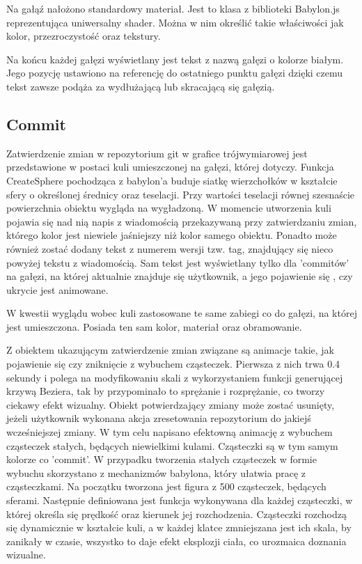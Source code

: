 \documentclass[12pt,a4paper,polish,thesis]{dcsbook}
\begin{document}
{	Na gałąź nałożono standardowy materiał. Jest to klasa z biblioteki Babylon.js reprezentująca uniwersalny shader.  Można w nim określić takie właściwości jak kolor, przezroczystość oraz tekstury.

	Na końcu każdej gałęzi wyświetlany jest tekst z nazwą gałęzi o kolorze białym. Jego pozycję ustawiono na referencję do ostatniego punktu gałęzi dzięki czemu tekst zawsze podąża za wydłużającą lub skracającą się gałęzią.



	\subsection{Commit}
	Zatwierdzenie zmian w repozytorium git w grafice trójwymiarowej jest przedstawione w postaci kuli umieszczonej na gałęzi, której dotyczy. Funkcja CreateSphere pochodząca z babylon'a buduje siatkę wierzchołków w kształcie sfery o określonej średnicy oraz teselacji. Przy wartości teselacji równej szesnaście powierzchnia obiektu wygląda na wygładzoną. W momencie utworzenia kuli  pojawia się nad nią napis z wiadomością przekazywaną przy zatwierdzaniu zmian, którego kolor jest niewiele jaśniejszy niż kolor samego obiektu. Ponadto może również zostać dodany tekst z numerem wersji tzw. tag, znajdujący się nieco powyżej tekstu z wiadomością. Sam tekst jest wyświetlany tylko dla 'commitów' na gałęzi, na której aktualnie znajduje się użytkownik, a jego pojawienie się , czy ukrycie jest animowane.

	 W kwestii wyglądu wobec kuli zastosowane te same zabiegi co do gałęzi, na której jest umieszczona. Posiada ten sam kolor, materiał oraz obramowanie.

	Z obiektem ukazującym zatwierdzenie zmian związane są animacje takie, jak pojawienie się czy zniknięcie z wybuchem cząsteczek. Pierwsza z nich trwa 0.4 sekundy i polega na modyfikowaniu skali z wykorzystaniem funkcji generującej krzywą Beziera, tak by przypominało to sprężanie i rozprężanie, co tworzy ciekawy efekt wizualny. Obiekt potwierdzający zmiany może zostać usunięty, jeżeli użytkownik wykonana akcja zresetowania repozytorium do jakiejś wcześniejszej zmiany. W tym celu napisano efektowną animację z wybuchem cząsteczek stałych, będących niewielkimi kulami. Cząsteczki są w tym samym kolorze co 'commit'. W przypadku tworzenia stałych cząsteczek w formie wybuchu skorzystano z mechanizmów babylona, który ułatwia pracę z cząsteczkami. Na początku tworzona jest figura z 500 cząsteczek, będących sferami. Następnie definiowana jest funkcja wykonywana dla każdej cząsteczki, w której określa się prędkość oraz kierunek jej rozchodzenia. Cząsteczki rozchodzą się dynamicznie w kształcie kuli, a w każdej klatce zmniejszana jest ich skala, by zanikały w czasie, wszystko to daje efekt eksplozji ciała, co urozmaica doznania wizualne.

}
\end{document}
